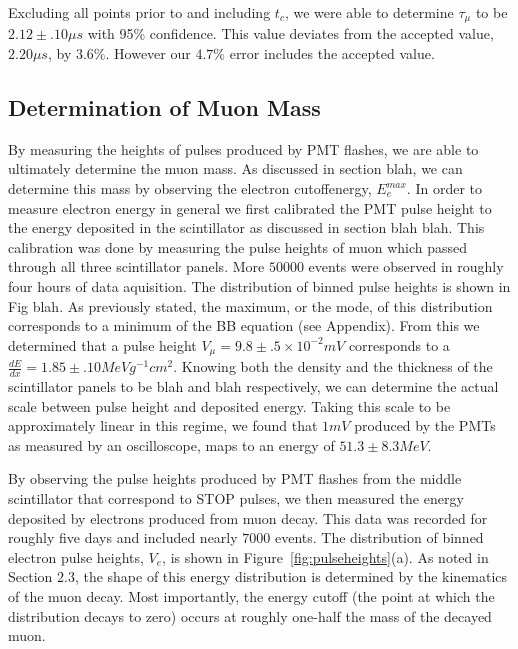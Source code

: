 Excluding all points prior to and including $t_{c}$, we were able to determine $\tau_{\mu}$ to be $2.12 \pm .10 \mu s$ with 95\% confidence.  This value deviates from the accepted value, $2.20\mu s$, by $3.6\%$.  However our $4.7\%$ error includes the accepted value.






\subsection{Determination of Muon Mass}

By measuring the heights of pulses produced by PMT flashes, we are
able to ultimately determine the muon mass.  As discussed in section
blah, we can determine this mass by observing the electron cutoffenergy, $E_{e}^{max}$. In order to measure electron energy in general
we first calibrated the PMT pulse height to the energy deposited in
the scintillator as discussed in section blah blah. This calibration
was done by measuring the pulse heights of muon which passed through
all three scintillator panels.  More $50000$ events were observed in
roughly four hours of data aquisition.  The distribution of binned
pulse heights is shown in Fig blah.  As previously stated, the
maximum, or the mode, of this distribution corresponds to a minimum of
the BB equation (see Appendix).  From this we determined that a pulse
height $V_{\mu} = 9.8\pm.5 \times 10^{-2} mV$ corresponds to a $\frac{dE}{dx}= 1.85\pm.10 MeV
g^{-1} cm^{2}$.  Knowing both the density and the thickness of the
scintillator panels to be blah and blah respectively, we can determine
the actual scale between pulse height and deposited energy.  Taking
this scale to be approximately linear in this regime, we found that
$1mV$ produced by the PMTs as measured by an oscilloscope, maps to an
energy of $51.3 \pm 8.3 MeV$.



By observing the pulse heights produced by PMT flashes from the middle scintillator that correspond to STOP pulses, we then measured the energy deposited by electrons produced from muon decay.  This data was recorded for roughly five days and included nearly $7000$ events.  The distribution of binned electron pulse heights, $V_{e}$, is shown in Figure~\ref{fig:pulseheights}(a).  As noted in Section $2.3$, the shape of this energy distribution is determined by the kinematics of the muon decay.  Most importantly, the energy cutoff (the point at which the distribution decays to zero) occurs at roughly one-half the mass of the decayed muon.

